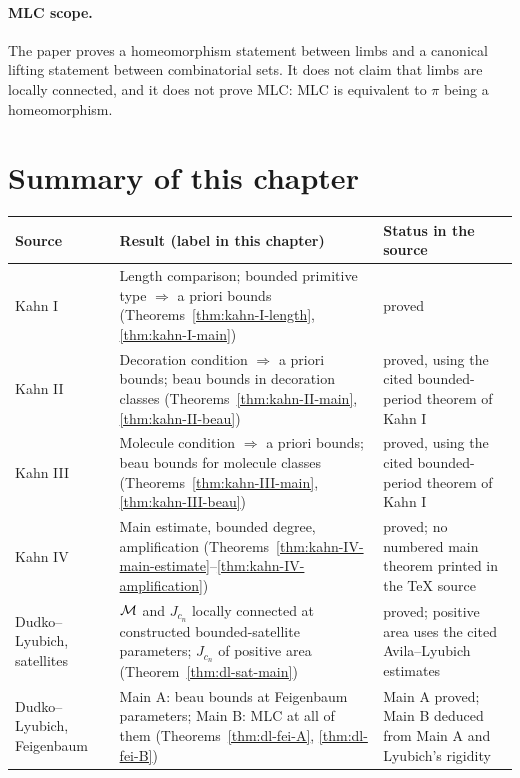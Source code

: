 \paragraph{MLC scope.}
The paper proves a homeomorphism statement between limbs and a canonical lifting statement between combinatorial sets.  It does
not claim that limbs are locally connected, and it does not prove MLC: MLC is equivalent to $\pi$ being a homeomorphism.

\section{Summary of this chapter}
\label{sec:apriori-summary}

\begin{table}[ht]
\centering\small
\begin{tabularx}{\textwidth}{@{}>{\raggedright\arraybackslash}p{}>{\raggedright\arraybackslash}X>{\raggedright\arraybackslash}p{}@{}}
\textbf{Source} & \textbf{Result (label in this chapter)} & \textbf{Status in the source}\\
\hline
Kahn I &
Length comparison; bounded primitive type $\Rightarrow$ a priori bounds (Theorems~\ref{thm:kahn-I-length}, \ref{thm:kahn-I-main}) &
proved\\
Kahn II &
Decoration condition $\Rightarrow$ a priori bounds; beau bounds in decoration classes (Theorems~\ref{thm:kahn-II-main}, \ref{thm:kahn-II-beau}) &
proved, using the cited bounded-period theorem of Kahn I\\
Kahn III &
Molecule condition $\Rightarrow$ a priori bounds; beau bounds for molecule classes (Theorems~\ref{thm:kahn-III-main}, \ref{thm:kahn-III-beau}) &
proved, using the cited bounded-period theorem of Kahn I\\
Kahn IV &
Main estimate, bounded degree, amplification (Theorems~\ref{thm:kahn-IV-main-estimate}--\ref{thm:kahn-IV-amplification}) &
proved; no numbered main theorem printed in the TeX source\\
Dudko--Lyubich, satellites &
$\mathcal M$ and $J_{c_n}$ locally connected at constructed bounded-satellite parameters; $J_{c_n}$ of positive area (Theorem~\ref{thm:dl-sat-main}) &
proved; positive area uses the cited Avila--Lyubich estimates\\
Dudko--Lyubich, Feigenbaum &
Main A: beau bounds at Feigenbaum parameters; Main B: MLC at all of them (Theorems~\ref{thm:dl-fei-A}, \ref{thm:dl-fei-B}) &
Main A proved; Main B deduced from Main A and Lyubich's rigidity\\

\end{tabularx}
\end{table}
